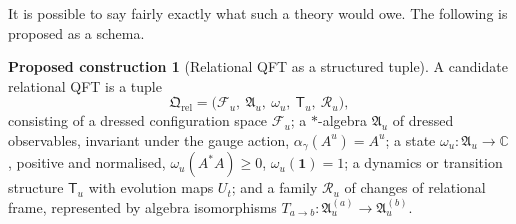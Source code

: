 \documentclass[11pt]{article}
\theoremstyle{plain}
\theoremstyle{definition}
\newtheorem{construction}{Proposed construction}
\theoremstyle{remark}
\newcommand{\F}{\mathcal F}
\newcommand{\R}{\mathcal R}
\begin{document}
It is possible to say fairly exactly what such a theory would owe. The following is proposed as a schema.

\begin{construction}[Relational QFT as a structured tuple]\label{con:rqft}
A candidate relational QFT is a tuple
\begin{equation}
\mathfrak Q_{\mathrm{rel}}=\big(\F_u,\ \mathfrak A_u,\ \omega_u,\ \mathsf T_u,\ \R_u\big),
\end{equation}
consisting of a dressed configuration space $\F_u$; a $*$-algebra $\mathfrak A_u$ of dressed observables, invariant under the gauge action, $\alpha_\gamma(A^u)=A^u$; a state $\omega_u:\mathfrak A_u\to\mathbb C$, positive and normalised, $\omega_u(A^*A)\ge0$, $\omega_u(\mathbf 1)=1$; a dynamics or transition structure $\mathsf T_u$ with evolution maps $U_t$; and a family $\R_u$ of changes of relational frame, represented by algebra isomorphisms $T_{a\to b}:\mathfrak A^{(a)}_u\to\mathfrak A^{(b)}_u$.
\end{construction}
\end{document}
